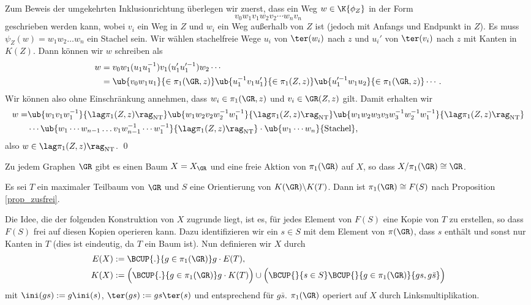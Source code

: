 Zum Beweis der umgekehrten Inklusionrichtung überlegen wir zuerst,
dass ein Weg $w\in \K{\phi_Z}$ in der Form
\[
v_0 w_1 v_1 w_2 v_2 \cdots w_n v_n
\]
geschrieben werden kann, wobei $v_i$ ein Weg in $Z$ und $w_i$ ein
Weg außerhalb von $Z$ ist (jedoch mit Anfangs und Endpunkt in $Z$).
Es muss $\psi_Z(w)=w_1 w_2 \ldots w_n$ ein Stachel sein.
Wir wählen stachelfreie Wege $u_i$ von $\ter(w_i)$ nach
$z$ und $u_i'$ von $\ter(v_i)$ nach $z$ mit Kanten in $K(Z)$.
Dann können wir $w$ schreiben als
\begin{align*}
w &= v_0 w_1 (u_1 u_1^{-1}) v_1 (u_1' u_1'^{-1}) w_2 \cdots \\
&=\ub{v_0 w_1 u_1}{\in \pi_1(\GR,z)}
\ub{u_1^{-1} v_1 u_1'}{\in \pi_1(Z,z)}
\ub{u_1'^{-1} w_1 u_2}{\in \pi_1(\GR,z)} \cdots .
\end{align*}
Wir können also ohne Einschränkung annehmen, dass
$w_i\in\pi_1(\GR,z)$ und $v_i\in\GR(Z,z)$ gilt. Damit erhalten wir
\begin{align*}
w =&
\ub{w_1 v_1 w_1^{-1}}{\lag \pi_1(Z,z)\rag_{\mathrm{NT}}}
\ub{w_1 w_2 v_2 w_2^{-1} w_1^{-1}}{\lag \pi_1(Z,z)\rag_{\mathrm{NT}}}
\ub{w_1 w_2 w_3 v_3 w_3^{-1} w_2^{-1} w_1^{-1}}{\lag \pi_1(Z,z)\rag_{\mathrm{NT}}}\\
&\cdots
\ub{w_1\cdots w_{n-1}\ldots v_1 w_{n-1}^{-1}\cdots w_1^{-1}}{\lag \pi_1(Z,z)\rag_{\mathrm{NT}}}
\cdot
\ub{w_1\cdots w_n}{\text{Stachel}},
\end{align*}
also $w\in\lag \pi_1(Z,z)\rag_{\mathrm{NT}}$.
\qed

\PROP Zu jedem Graphen $\GR$ gibt es einen Baum $X=X_{\GR}$ und eine
freie Aktion von $\pi_1(\GR)$ auf $X$, so dass
$X/\pi_1(\GR)\cong \GR$.

\bew
Es sei $T$ ein maximaler Teilbaum von $\GR$ und $S$ eine Orientierung
von $K(\GR)\backslash K(T)$. Dann ist $\pi_1(\GR)\cong F(S)$
nach Proposition \ref{prop_zusfrei}.

Die Idee, die der folgenden Konstruktion von $X$ zugrunde liegt,
ist es, für jedes Element von $F(S)$ eine Kopie von
$T$ zu erstellen, so dass $F(S)$ frei auf diesen Kopien operieren
kann. Dazu identifizieren wir ein $s\in S$ mit dem Element
von $\pi(\GR)$, dass $s$ enthält und sonst nur Kanten in $T$
(dies ist eindeutig, da $T$ ein Baum ist).
Nun definieren wir $X$ durch
\begin{align*}
E(X) &:= \BCUP{.}{g\in\pi_1(\GR)} g\cdot E(T), \\
K(X) &:= \Bigl(\BCUP{.}{g\in\pi_1(\GR)} g\cdot K(T)\Bigr)
\cup
\Bigl(\BCUP{}{s\in S}\BCUP{}{g\in\pi_1(\GR)} \{gs, g\bar{s} \}\Bigr)
\end{align*}
mit $\ini(gs):=g\ini(s)$, $\ter(gs):=gs\ter(s)$ und entsprechend
für $g\bar{s}$.
$\pi_1(\GR)$ operiert auf $X$ durch Linksmultiplikation.

